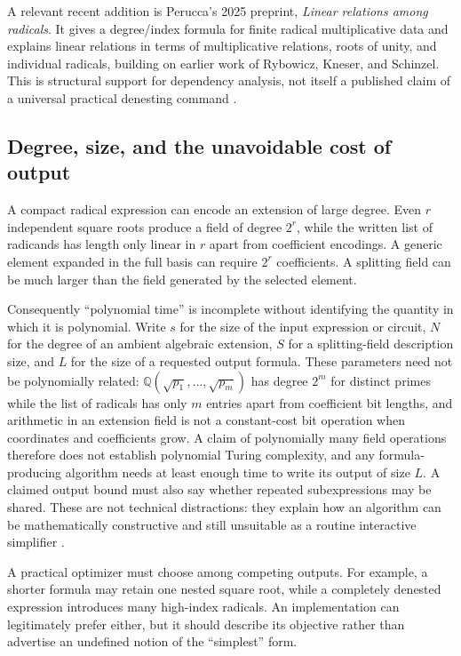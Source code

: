 \documentclass[11pt,oneside]{article}
\numberwithin{equation}{section}
\theoremstyle{definition}
\theoremstyle{remark}
\newcommand{\Q}{\mathbb{Q}}
\begin{document}
A relevant recent addition is Perucca's 2025 preprint, \emph{Linear relations among radicals}. It gives a degree/index formula for finite radical multiplicative data and explains linear relations in terms of multiplicative relations, roots of unity, and individual radicals, building on earlier work of Rybowicz, Kneser, and Schinzel. This is structural support for dependency analysis, not itself a published claim of a universal practical denesting command \cite{perucca}.

\subsection{Degree, size, and the unavoidable cost of output}
A compact radical expression can encode an extension of large degree. Even $r$ independent square roots produce a field of degree $2^r$, while the written list of radicands has length only linear in $r$ apart from coefficient encodings. A generic element expanded in the full basis can require $2^r$ coefficients. A splitting field can be much larger than the field generated by the selected element.

Consequently ``polynomial time'' is incomplete without identifying the quantity in which it is polynomial. Write $s$ for the size of the input expression or circuit, $N$ for the degree of an ambient algebraic extension, $S$ for a splitting-field description size, and $L$ for the size of a requested output formula. These parameters need not be polynomially related: $\Q(\sqrt{p_1},\ldots,\sqrt{p_m})$ has degree $2^m$ for distinct primes while the list of radicals has only $m$ entries apart from coefficient bit lengths, and arithmetic in an extension field is not a constant-cost bit operation when coordinates and coefficients grow. A claim of polynomially many field operations therefore does not establish polynomial Turing complexity, and any formula-producing algorithm needs at least enough time to write its output of size $L$. A claimed output bound must also say whether repeated subexpressions may be shared. These are not technical distractions: they explain how an algorithm can be mathematically constructive and still unsuitable as a routine interactive simplifier \cite{bfht,blomerthesis,blomer2000}.

A practical optimizer must choose among competing outputs. For example, a shorter formula may retain one nested square root, while a completely denested expression introduces many high-index radicals. An implementation can legitimately prefer either, but it should describe its objective rather than advertise an undefined notion of the ``simplest'' form.
\end{document}
